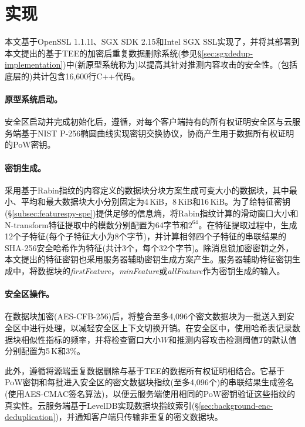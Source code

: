 \section{\prototype 实现}
\label{sec:featurespy-implementation}
本文基于OpenSSL 1.1.1l、SGX SDK 2.15和Intel SGX SSL实现了\sysnameF，并将其部署到本文提出的基于TEE的加密后重复数据删除系统\sysnameS (参见\S\ref{sec:sgxdedup-implementation})中(新原型系统称为\prototype)以提高其针对推测内容攻击的安全性。\prototype(包括底层的\sysnameS )共计包含16,600行C++代码。

\paragraph*{原型系统启动。}
安全区启动并完成初始化后，\prototype 遵循\sysnameS，对每个客户端持有的所有权证明安全区与云服务端基于NIST P-256椭圆曲线实现密钥交换协议，协商产生用于数据所有权证明的PoW密钥。

\paragraph*{密钥生成。}
\prototype 采用基于Rabin指纹的内容定义的数据块分块方案生成可变大小的数据块，其中最小、平均和最大数据块大小分别固定为4\,KiB，8\,KiB和16\,KiB。为了给特征密钥(\S\ref{subsec:featurespy-spe})提供足够的信息熵，将Rabin指纹计算的滑动窗口大小和N-transform特征提取中的模数分别配置为64字节和$2^{64}$。在特征提取过程中，生成12个子特征(每个子特征大小为8个字节)，并计算相邻四个子特征的串联结果的SHA-256安全哈希作为特征(共计3个，每个32个字节)。除消息锁加密密钥之外，本文提出的特征密钥也采用服务器辅助密钥生成方案产生。服务器辅助特征密钥生成中，将数据块的\textit{firstFeature}，\textit{minFeature}或\textit{allFeature}作为密钥生成的输入。

\paragraph*{安全区操作。}
在数据块加密(AES-CFB-256)后，\prototype 将整合至多4,096个密文数据块为一批送入到安全区中进行处理，以减轻安全区上下文切换开销。在安全区中，\prototype 使用哈希表记录数据块相似性指标的频率，并将检查窗口大小$W$和推测内容攻击检测阈值$T$的默认值分别配置为5\,K和3\%。

此外，\prototype 遵循\sysnameS 将源端重复数据删除与基于TEE的数据所有权证明相结合。它基于PoW密钥和每批进入安全区的密文数据块指纹(至多4,096个)的串联结果生成签名(使用AES-CMAC签名算法)，以便云服务端使用相同的PoW密钥验证这些指纹的真实性。云服务端基于LevelDB实现数据块指纹索引(\S\ref{sec:background-enc-deduplication})，并通知客户端只传输非重复的密文数据块。

